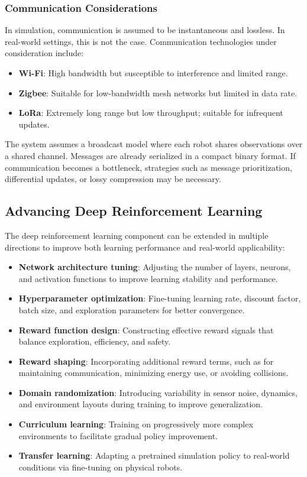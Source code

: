 \subsubsection{Communication Considerations}\label{sub:communication}
In simulation, communication is assumed to be instantaneous and lossless. In real-world settings, this is not the case. Communication technologies under consideration include:

\begin{itemize}
  \item \textbf{Wi-Fi}: High bandwidth but susceptible to interference and limited range.
  \item \textbf{Zigbee}: Suitable for low-bandwidth mesh networks but limited in data rate.
  \item \textbf{LoRa}: Extremely long range but low throughput; suitable for infrequent updates.
\end{itemize}

The system assumes a broadcast model where each robot shares observations over a shared channel. Messages are already serialized in a compact binary format. If communication becomes a bottleneck, strategies such as message prioritization, differential updates, or lossy compression may be necessary.

\subsection{Advancing Deep Reinforcement Learning}
The deep reinforcement learning component can be extended in multiple directions to improve both learning performance and real-world applicability:

\begin{itemize}
  \item \textbf{Network architecture tuning}: Adjusting the number of layers, neurons, and activation functions to improve learning stability and performance.
  \item \textbf{Hyperparameter optimization}: Fine-tuning learning rate, discount factor, batch size, and exploration parameters for better convergence.
  \item \textbf{Reward function design}: Constructing effective reward signals that balance exploration, efficiency, and safety.
  \item \textbf{Reward shaping}: Incorporating additional reward terms, such as for maintaining communication, minimizing energy use, or avoiding collisions.
  \item \textbf{Domain randomization}: Introducing variability in sensor noise, dynamics, and environment layouts during training to improve generalization.
  \item \textbf{Curriculum learning}: Training on progressively more complex environments to facilitate gradual policy improvement.
  \item \textbf{Transfer learning}: Adapting a pretrained simulation policy to real-world conditions via fine-tuning on physical robots.
\end{itemize}

